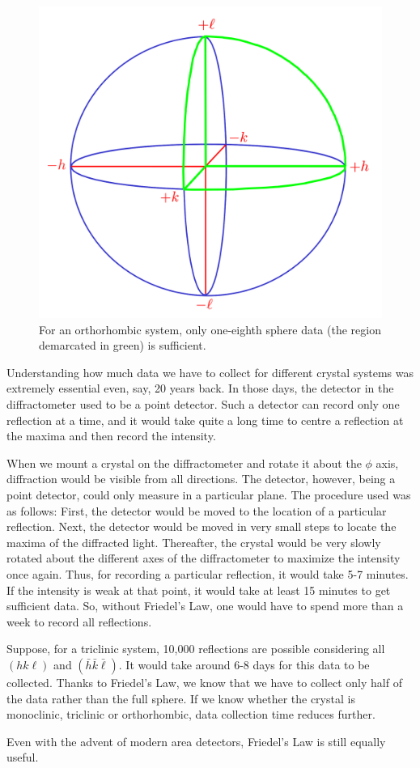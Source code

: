 \begin{figure}
	\centering
	\includegraphics[scale=0.15]{one_eighth_sphere.png}
	\caption{\label{fig:one_eighth_sphere}For an orthorhombic system, only one-eighth sphere data (the region demarcated in green) is sufficient.}
\end{figure}

Understanding how much data we have to collect for different crystal systems was extremely essential even, say, 20 years back. In those days, the detector in the diffractometer used to be a point detector. Such a detector can record only one reflection at a time, and it would take quite a long time to centre a reflection at the maxima and then record the intensity. 

When we mount a crystal on the diffractometer and rotate it about the $\phi$ axis, diffraction would be visible from all directions. The detector, however, being a point detector, could only measure in a particular plane. The procedure used was as follows: First, the detector would be moved to the location of a particular reflection. Next, the detector would be moved in very small steps to locate the maxima of the diffracted light. Thereafter, the crystal would be very slowly rotated about the different axes of the diffractometer to maximize the intensity once again. Thus, for recording a particular reflection, it would take 5-7 minutes. If the intensity is weak at that point, it would take at least 15 minutes to get sufficient data. So, without Friedel's Law, one would have to spend more than a week to record all reflections.

Suppose, for a triclinic system, 10,000 reflections are possible considering all $(hk\ell)$ and $(\bar{h} \bar{k} \bar{\ell}).$ It would take around 6-8 days for this data to be collected. Thanks to Friedel's Law, we know that we have to collect only half of the data rather than the full sphere. If we know whether the crystal is monoclinic, triclinic or orthorhombic, data collection time reduces further.

Even with the advent of modern area detectors, Friedel's Law is still equally useful.